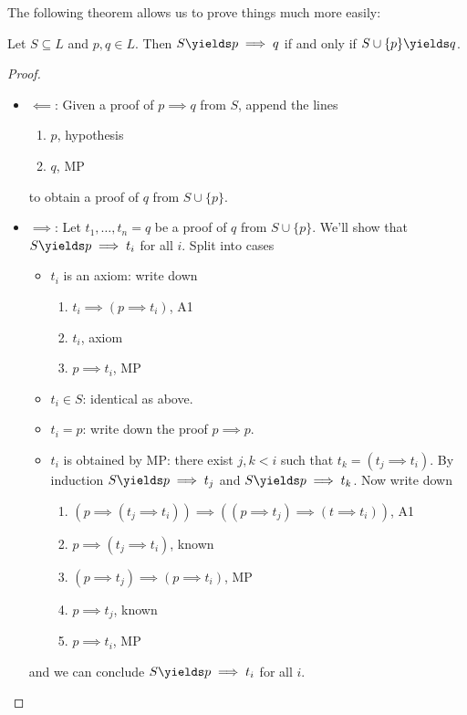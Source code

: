 \documentclass[a4paper]{article}
\begin{document}
The following theorem allows us to prove things much more easily:

\begin{theorem}\label{deduction theorem}
  Let \(S \subseteq L\) and \(p, q \in L\). Then \(S \yields p \implies q\) if and only if \(S \cup \{p\} \yields q\).
\end{theorem}

\begin{proof}\leavevmode
  \begin{itemize}
  \item \(\impliedby\): Given a proof of \(p \implies q\) from \(S\), append the lines
    \begin{enumerate}
    \item \(p\), hypothesis
    \item \(q\), MP
    \end{enumerate}
    to obtain a proof of \(q\) from \(S \cup \{p\}\).
  \item \(\implies\): Let \(t_1, \dots, t_n = q\) be a proof of \(q\) from \(S \cup \{p\}\). We'll show that \(S \yields p \implies t_i\) for all \(i\). Split into cases
    \begin{itemize}
    \item \(t_i\) is an axiom: write down
      \begin{enumerate}
      \item \(t_i \implies (p \implies t_i)\), A1
      \item \(t_i\), axiom
      \item \(p \implies t_i\), MP
      \end{enumerate}
    \item \(t_i \in S\): identical as above.
    \item \(t_i = p\): write down the proof \(p \implies p\).
    \item \(t_i\) is obtained by MP: there exist \(j, k < i\) such that \(t_k = (t_j \implies t_i)\). By induction \(S \yields p \implies t_j\) and \(S \yields p \implies t_k\). Now write down
      \begin{enumerate}
      \item \((p \implies (t_j \implies t_i)) \implies ((p \implies t_j) \implies (t \implies t_i))\), A1
      \item \(p \implies (t_j \implies t_i)\), known
      \item \((p \implies t_j) \implies (p \implies t_i)\), MP
      \item \(p \implies t_j\), known
      \item \(p \implies t_i\), MP
      \end{enumerate}
    \end{itemize}
    and we can conclude \(S \yields p \implies t_i\) for all \(i\).
  \end{itemize}
\end{proof}
\end{document}
